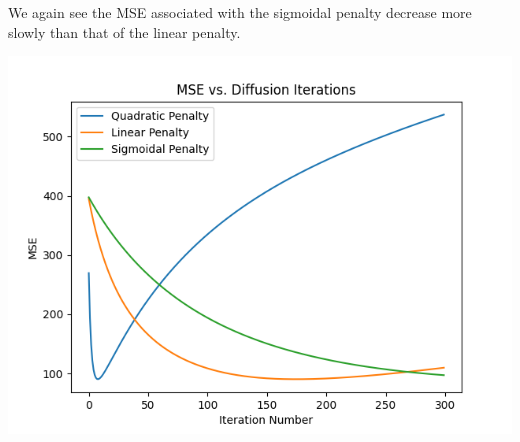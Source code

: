 \documentclass{article}
\begin{document}
  \noindent
  We again see the MSE associated with the sigmoidal
  penalty decrease more slowly than that of the linear penalty.

  \begin{center}
    \includegraphics[scale=0.5]{../generated_images/MSE_test4.png}\\
  \end{center}
\end{document}
